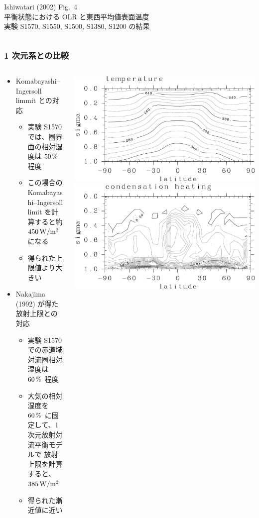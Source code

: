 \documentclass[aspectratio=149,9pt,fleqn]{beamer}
\begin{document}
\begin{frame}
\begin{columns}[T,onlytextwidth]
\begin{column}{.4\textwidth}
			\scriptsize Ishiwatari \etal (2002) Fig.\ 4\\
			平衡状態における OLR と東西平均値表面温度\\
			実験 S1570, S1550, S1500, S1380, S1200 の結果
		\end{column}
	\end{columns}
\end{frame}

\begin{frame}
	\frametitle{1 次元系との比較}
	\begin{columns}[T,onlytextwidth]
		\begin{column}{.45\textwidth}
			\begin{itemize}
				\item Komabayashi--Ingersoll limmit との対応
					\begin{itemize}
						\item 実験 S1570 では、圏界面の相対湿度は \(50\hmu{\%}\) 程度
						\item この場合の Komabayashi--Ingersoll limit を計算すると約 \(450\hmu{W/m^2}\) になる
						\item 得られた上限値より大きい
					\end{itemize}
				\item Nakajima \etal (1992) が得た放射上限との対応
					\begin{itemize}
						\item 実験 S1570 での赤道域対流圏相対湿度は \(60\hmu{\%}\) 程度
						\item 大気の相対湿度を \(60\hmu{\%}\) に固定して、1 次元放射対流平衡モデルで
							放射上限を計算すると、\(385\hmu{W/m^2}\)
						\item 得られた漸近値に近い
					\end{itemize}
			\end{itemize}
		\end{column}
		\begin{column}{.5\textwidth}
			\centering
			\includegraphics[width=.45\textwidth]{./fig/157-T-meri.kps-crop.pdf}
			\includegraphics[width=.45\textwidth]{./fig/157-Qcnd-meri.kps-crop.pdf}

\end{column}
\end{columns}
\end{frame}
\end{document}
